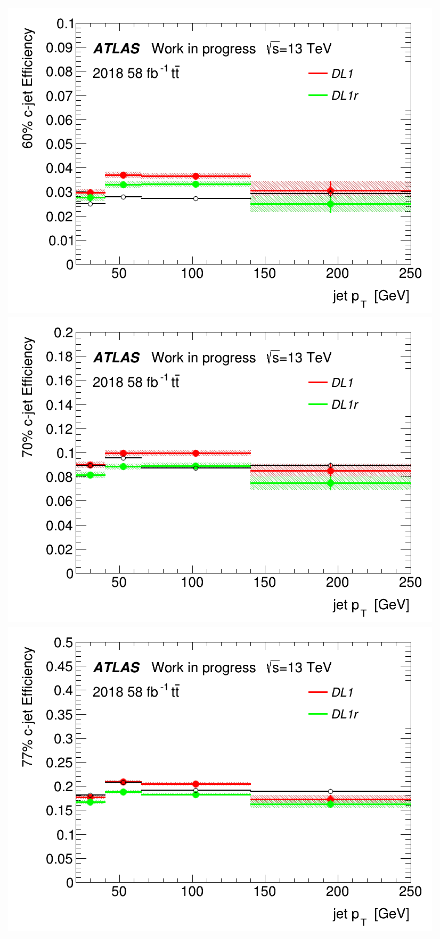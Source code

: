 \documentclass[letterpaper,12pt]{article}
\begin{document}
\begin{figure}[H]
\begin{minipage}[b]{.45\textwidth}
\centering
\includegraphics[width=1\textwidth]{March_highpT/eff60.png}
\end{minipage}\hfill
\begin{minipage}[b]{.45\textwidth}
\centering
\includegraphics[width=1\textwidth]{March_highpT/eff70.png}
\end{minipage}\hfill
\begin{minipage}[b]{.45\textwidth}
\centering
\includegraphics[width=1\textwidth]{March_highpT/eff77.png}

\end{minipage}
\end{figure}
\end{document}
